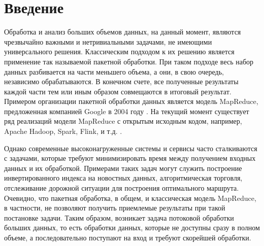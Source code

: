 \documentclass[14pt]{matmex-diploma-custom}
\begin{document}
\maketitle

\tableofcontents

\section*{Введение}

Обработка и анализ больших объемов данных, на данный момент,  являются чрезвычайно важными и нетривиальными задачами, не имеющими универсального решения. Классическим подходом к их решению является применение так называемой пакетной обработки. При таком подходе весь набор данных разбивается на части меньшего объема, а они, в свою очередь, независимо обрабатываются. В конечном счете, все полученные результаты каждой части тем или иным образом совмещаются в итоговый результат. Примером организации пакетной обработки данных является модель MapReduce, предложенная компанией Google в 2004 году \cite{mapreduce}. На текущий момент существует ряд реализаций модели MapReduce с открытым исходным кодом, например, Apache Hadoop, Spark, Flink, и т.д. \cite{hadoop}\cite{spark}\cite{flink}.

Однако современные высоконагруженные системы и сервисы часто сталкиваются с задачами, которые требуют минимизировать время между получением входных данных и их обработкой. Примерами таких задач могут служить построение инвертированного индекса на новостных данных, алгоритмическая торговля, отслеживание дорожной ситуации для построения оптимального маршрута.  Очевидно, что пакетная обработка, в общем, и классическая модель MapReduce, в частности, не позволяют получить приемлемые результаты при такой постановке задачи. Таким образом, возникает задача потоковой обработки больших данных, то есть обработки данных, которые не доступны сразу в полном объеме, а последовательно поступают на вход и требуют скорейшей обработки.
\end{document}
